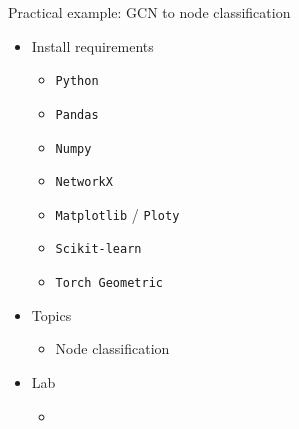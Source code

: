 \documentclass[aspectratio=169]{beamer}
\begin{document}
        \begin{frame}{Practical example: GCN to node classification} 
            \begin{itemize}
                \item Install requirements
                    \begin{itemize}
                        \item \texttt{Python}
                        \item \texttt{Pandas}
                        \item \texttt{Numpy}
                        \item \texttt{NetworkX}
                        \item \texttt{Matplotlib} / \texttt{Ploty}
                        \item \texttt{Scikit-learn}
                        \item \texttt{Torch Geometric}
                    \end{itemize}
                \item Topics 
                    \begin{itemize}
                        \item Node classification
                    \end{itemize}
                \item Lab
                    \begin{itemize}
                        \item              
                            \href{https://drive.google.com/file/d/19ByHxX1AsqLiV3uqIoW5KLiuEDgCWdA5/view?usp=sharing}{
                            }
                    \end{itemize}
            \end{itemize}
        \end{frame}
\end{document}
